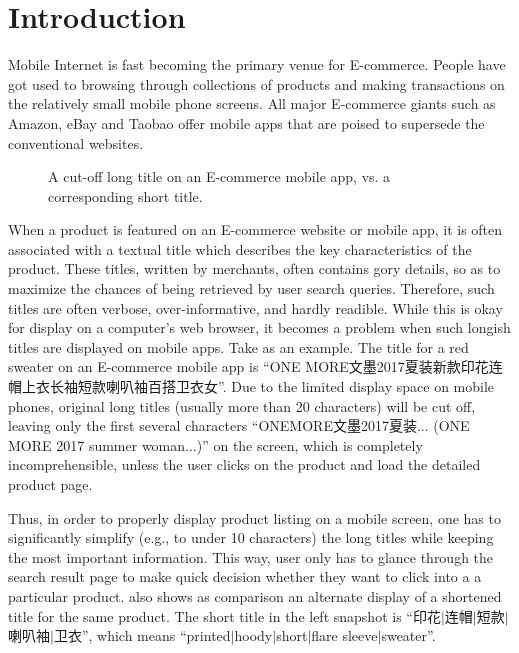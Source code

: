 \section{Introduction}

Mobile Internet is fast becoming the primary venue for E-commerce.
People have got used to browsing through collections of products and making
transactions on the relatively small mobile phone screens. 
All major E-commerce giants such as Amazon, 
eBay and Taobao offer mobile apps that are poised to supersede the conventional websites. 

\begin{figure}[th]
	\centering
	\caption{A cut-off long title on an E-commerce mobile app, vs. a corresponding
short title.}
	\label{fig:compare}
	\vspace{-10pt}
\end{figure}

When a product is featured on an E-commerce website or mobile app, it is often
associated with a textual title which describes the key characteristics of
the product. These titles, written by merchants,
often contains gory details, so as to maximize
the chances of being retrieved by user search queries.
Therefore, such titles are often verbose, over-informative, and hardly 
readible. 
While this is okay for display on a computer's web browser, it becomes a
problem when such longish titles are displayed on mobile apps.
Take  as an example. 
The title for a red sweater on an E-commerce mobile app is 
``ONE MORE文墨2017夏装新款印花连帽上衣长袖短款喇叭袖百搭卫衣女''.
Due to the limited display space on mobile phones, 
original long titles (usually more than 20 characters) will be cut off, 
leaving only the first several characters ``ONEMORE文墨2017夏装... 
(ONE MORE 2017 summer woman...)'' 
on the screen, which is completely incomprehensible, unless the user
clicks on the product and load the detailed product page.  

Thus, in order to properly display product listing on a mobile screen,
one has to significantly simplify (e.g., to under 10 characters) 
the long titles while keeping the most important information.
This way, user only has to glance through the search result page
to make quick decision whether they want to click into a a particular 
product.
 also shows as comparison an alternate display
of a shortened title for the same product.
The short title in the left snapshot is ``印花$|$连帽$|$短款$|$喇叭袖$|$卫衣'',
which means ``printed$|$hoody$|$short$|$flare sleeve$|$sweater''. 

